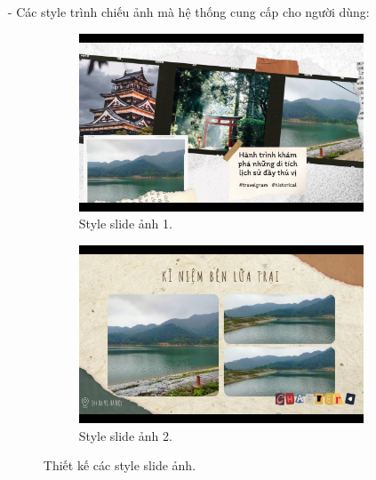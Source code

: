 \begin{enumerate}
\begin{itemize}
        \item[-] Các style trình chiếu ảnh mà hệ thống cung cấp cho người dùng:
        \begin{figure}[H]
            \centering
            \begin{subfigure}{0.48\textwidth}
                \includegraphics[width=1\linewidth]{figures/c4/4_1/slide_1.jpg} 
                \caption{Style slide ảnh 1.}
            \end{subfigure}
            \hfill
            \begin{subfigure}{0.48\textwidth}
                \includegraphics[width=1\linewidth]{figures/c4/4_1/slide_2.jpg} 
                \caption{Style slide ảnh 2.}
            \end{subfigure}
            \caption{Thiết kế các style slide ảnh.}
            \label{fig:slider-styles}
        \end{figure}
    \end{itemize}
    

\end{enumerate}
